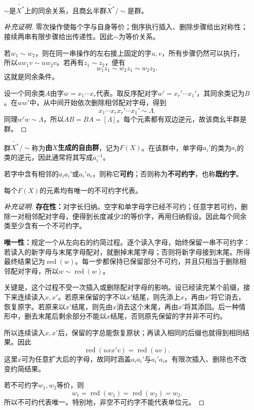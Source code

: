 \begin{proposition}
$\sim$是$\widetilde{X^*}$上的同余关系，且商幺半群$\widetilde{X^*}/{\sim}$是群。
\end{proposition}
\begin{proof}[补充证明]
零次操作使每个字与自身等价；倒序执行插入、删除步骤给出对称性；接续两串有限步骤给出传递性。因此$\sim$为等价关系。

若$w_1\sim w_2$，则在同一串操作的左右接上固定的字$u,v$，所有步骤仍然可以执行，所以$uw_1v\sim uw_2v$。若再有$z_1\sim z_2$，便有
\[
w_1z_1\sim w_2z_1\sim w_2z_2.
\]
这就是同余条件。

设一个同余类$A$由字$w=x_1\cdots x_r$代表。取反序配对字$w'=x_r'\cdots x_1'$，其同余类记为$B$。在$ww'$中，从中间开始依次删除相邻配对字母，得到
\[
x_1\cdots x_rx_r'\cdots x_1'\sim\Lambda.
\]
同理$w'w\sim\Lambda$，所以$AB=BA=[\Lambda]$。每个元素都有双边逆元，故该商幺半群是群。
\end{proof}

\begin{definition}
群$\widetilde{X^*}/{\sim}$称为\textbf{由$X$生成的自由群}，记为$F(X)$。在该群中，单字母$a_i'$的类为$a_i$的类的逆元，因此通常将其写成$a_i^{-1}$。

若字中含有相邻的$a_ia_i'$或$a_i'a_i$，则称它\textbf{可约}；否则称为\textbf{不可约字}，也称\textbf{既约字}。
\end{definition}

\begin{proposition}
每个$F(X)$的元素均有唯一的不可约字代表。
\end{proposition}
\begin{proof}[补充证明]
\textbf{存在性：}对字长归纳。空字和单字母字已经不可约；任意字若可约，删除一对相邻配对字母，便得到长度减少2的等价字，再用归纳假设。因此每个同余类至少含有一个不可约字。

\textbf{唯一性：}规定一个从左向右的约简过程。逐个读入字母，始终保留一串不可约字：若读入的新字母与末尾字母配对，就删掉末尾字母；否则将新字母接到末尾。所得最终结果记为$\operatorname{red}(w)$。每一步都保持已保留部分不可约，并且只相当于删除相邻配对字母，所以$w\sim\operatorname{red}(w)$。

关键是，这个过程不受一次插入或删除配对字母的影响。设已经读完某个前缀，接下来连续读入$x,x'$。若原来保留的字不以$x'$结尾，则先添上$x$，再由$x'$将它消去，恢复原字。若原来以$x'$结尾，则先由$x$消去这个末尾，再由$x'$将其添回。后一种情形中，删去末尾后剩余部分不能以$x$结尾，否则原先保留的字并非不可约。

所以连续读入$x,x'$后，保留的字总能恢复原状；再读入相同的后缀也就得到相同结果。因此
\[
\operatorname{red}(uxx'v)=\operatorname{red}(uv).
\]
这里$x$可为任意扩大后的字母，故同时涵盖$a_ia_i'$与$a_i'a_i$。有限次插入、删除也不改变约简结果。

若不可约字$w_1,w_2$等价，则
\[
w_1=\operatorname{red}(w_1)=\operatorname{red}(w_2)=w_2.
\]
所以不可约代表唯一。特别地，非空不可约字不能代表单位元。
\end{proof}

